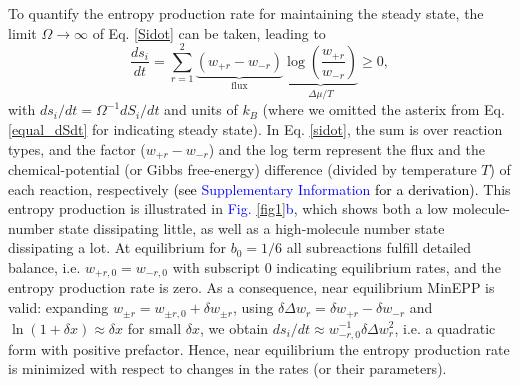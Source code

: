 \documentclass[aps,prl,reprint,singlecolumn,superscriptaddress]{revtex4}
\begin{document}
{To quantify the entropy production rate for maintaining the steady state, the limit $\Omega\rightarrow\infty$ of Eq. \ref{Sidot} can be taken,
leading to \cite{gaspard04}
\begin{equation}
\frac{ds_i}{dt}=\sum_{r=1}^2\underbrace{(w_{+r}-w_{-r})}_{\text{flux}}\underbrace{\log\left(\frac{w_{+r}}{w_{-r}}\right)}_{\Delta\mu/T}\geq0,\label{sidot}
\end{equation}
with $ds_i/dt=\Omega^{-1}dS_i/dt$ and units of $k_B$ (where we omitted the asterix from Eq. \ref{equal_dSdt} for indicating steady state). 
In Eq. \ref{sidot}, the sum is over reaction types, and the factor ($w_{+r}-w_{-r}$) and the log term represent 
the flux and the chemical-potential (or Gibbs free-energy) difference (divided by temperature $T$) of each reaction, respectively 
\textcolor{black}{(see \textcolor{blue}{Supplementary Information} for a derivation).} This entropy production is illustrated
in \textcolor{blue}{Fig. \ref{fig1}b}, which shows both a low molecule-number state dissipating little, as well as a high-molecule number state 
dissipating a lot. At equilibrium for $b_0=1/6$
all subreactions fulfill detailed balance, i.e. $w_{+r,0}=w_{-r,0}$ with subscript $0$ indicating equilibrium rates, and the entropy production rate
is zero. As a consequence, near equilibrium MinEPP is valid: expanding $w_{\pm r}=w_{\pm r,0}+\delta w_{\pm r}$, 
using $\delta\Delta w_r=\delta w_{+r}-\delta w_{-r}$ 
and $\ln(1+\delta x)\approx \delta x$ for small $\delta x$, we obtain $ds_i/dt\approx w_{-r,0}^{-1}\delta\Delta w_r^2$, i.e. a quadratic form 
with positive prefactor. Hence, near equilibrium the entropy production rate is minimized {with respect to changes in the
rates (or their parameters).}

}
\end{document}
